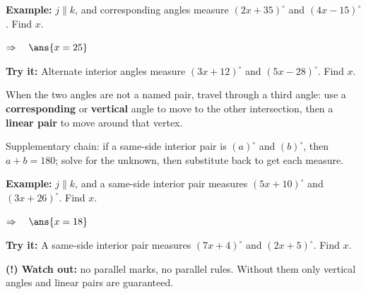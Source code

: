 \documentclass[12pt]{article}
\begin{document}
\begin{examplebox}
\textbf{Example:} \quad $j \parallel k$, and corresponding angles measure $(2x + 35)^\circ$ and $(4x - 15)^\circ$. Find $x$.

$\Rightarrow\quad \ans{x = 25}$
\end{examplebox}

\begin{tryitbox}
\textbf{Try it:} \quad Alternate interior angles measure $(3x + 12)^\circ$ and $(5x - 28)^\circ$. Find $x$.\\[2pt]
\end{tryitbox}


\begin{formulabox}
When the two angles are not a named pair, travel through a third angle: use a \textbf{corresponding} or \textbf{vertical} angle to move to the other intersection, then a \textbf{linear pair} to move around that vertex.\par
Supplementary chain: if a same-side interior pair is $(a)^\circ$ and $(b)^\circ$, then $a + b = 180$; solve for the unknown, then substitute back to get each measure.
\end{formulabox}

\begin{examplebox}
\textbf{Example:} \quad $j \parallel k$, and a same-side interior pair measures $(5x + 10)^\circ$ and $(3x + 26)^\circ$. Find $x$.

$\Rightarrow\quad \ans{x = 18}$
\end{examplebox}

\begin{tryitbox}
\textbf{Try it:} \quad A same-side interior pair measures $(7x + 4)^\circ$ and $(2x + 5)^\circ$. Find $x$.\\[2pt]
\end{tryitbox}

\begin{watchoutbox}
\textbf{(!) Watch out:} no parallel marks, no parallel rules. Without them only vertical angles and linear pairs are guaranteed.
\end{watchoutbox}
\end{document}
